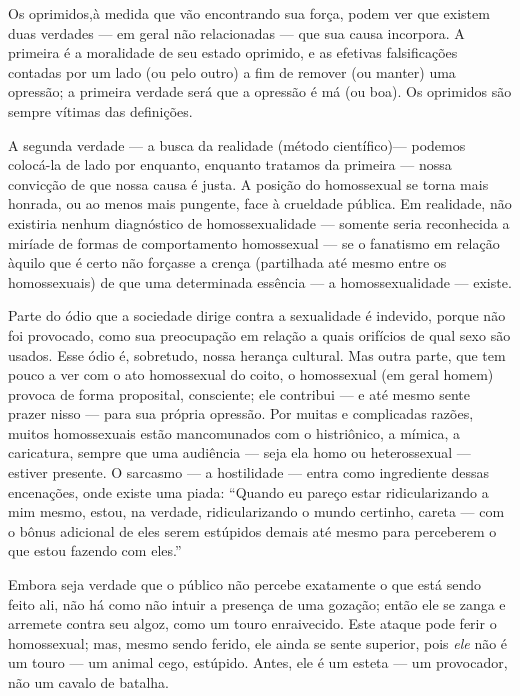 Os oprimidos,\idxhosthomo[|(] à medida que vão encontrando sua força, podem ver que
existem duas verdades --- em geral não relacionadas --- que sua causa
incorpora. A primeira é a moralidade de seu estado oprimido, e as
efetivas falsificações contadas por um lado (ou pelo outro) a fim de
remover (ou manter) uma opressão; a primeira verdade será que a
opressão é má (ou boa). Os oprimidos são sempre vítimas das definições.

A segunda verdade --- a busca da realidade (método científico)\idxdiagmeto[|)] ---
podemos colocá-la de lado por enquanto, enquanto tratamos da primeira
 --- nossa convicção de que nossa causa é justa. A posição do
homossexual se torna mais honrada, ou ao menos mais pungente, face à
crueldade pública. Em realidade, não existiria nenhum diagnóstico de
homossexualidade --- somente seria reconhecida a miríade de formas de
comportamento homossexual --- se o fanatismo em relação àquilo que é
certo não forçasse a crença (partilhada até mesmo entre os
homossexuais) de que uma determinada essência --- a homossexualidade
 --- existe.

 Parte do ódio que a sociedade\idxdiagforc{} dirige contra a sexualidade é %
indevido, porque não foi provocado, como sua preocupação em relação a
quais orifícios de qual sexo são usados. Esse ódio é, sobretudo, nossa
herança cultural. Mas outra parte, que tem pouco a ver com o ato
homossexual do coito, o homossexual (em geral homem) provoca de forma
proposital, consciente; ele contribui --- e até mesmo sente prazer
nisso --- para sua própria opressão. Por muitas e complicadas razões,
muitos homossexuais estão mancomunados com o histriônico, a mímica, a
caricatura, sempre que uma audiência --- seja ela homo ou
heterossexual --- estiver presente. O sarcasmo --- a hostilidade ---
entra como ingrediente dessas encenações, onde existe uma piada:
``Quando eu pareço estar ridicularizando a mim mesmo,
estou, na verdade, ridicularizando o mundo certinho, careta --- com o
bônus adicional de eles serem estúpidos demais até mesmo para
perceberem o que estou fazendo com eles.''

Embora seja verdade que o público não percebe exatamente o que está
sendo feito ali, não há como não intuir a presença de uma gozação;
então ele se zanga e arremete contra seu algoz, como um touro
enraivecido. Este ataque pode ferir o homossexual; mas, mesmo sendo
ferido, ele ainda se sente superior, pois \textit{ele} não é um touro
 --- um animal cego, estúpido. Antes, ele é um esteta --- um
provocador, não um cavalo de batalha.

